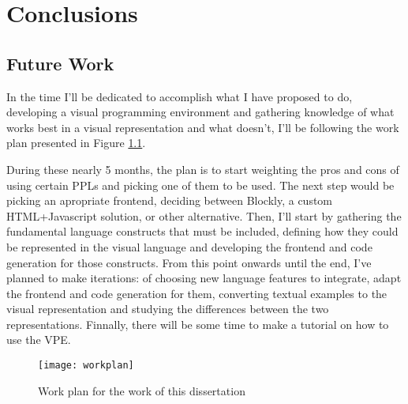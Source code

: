 \chapter{Conclusions} \label{chap:concl}

\section*{}

\section{Future Work}

In the time I'll be dedicated to accomplish what I have proposed to do, developing
a visual programming environment and gathering knowledge of what works best in
a visual representation and what doesn't, I'll be following the work plan presented
in Figure \ref{fig:workplan}.

During these nearly 5 months, the plan is to start weighting the pros and cons
of using certain PPLs and picking one of them to be used. The next step would be
picking an apropriate frontend, deciding between Blockly, a custom HTML+Javascript
solution, or other alternative. Then, I'll start by gathering the fundamental
language constructs that must be included, defining how they could be represented
in the visual language and developing the frontend and code generation for those constructs.
From this point onwards until the end, I've planned to make iterations: of choosing
new language features to integrate, adapt the frontend and code generation for them,
converting textual examples to the visual representation and studying the differences
between the two representations. Finnally, there
will be some time to make a tutorial on how to use the VPE.

\begin{figure}[t]
  \begin{center}
    \leavevmode
    \texttt{[image: workplan]}
    \caption{Work plan for the work of this dissertation}
    \label{fig:workplan}
  \end{center}
\end{figure}
